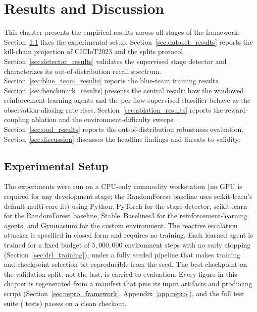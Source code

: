 \clearpage
\chapter{Results and Discussion}\label{cap:results}

This chapter presents the empirical results across all stages of the framework. Section~\ref{sec:exp_setup} fixes the experimental setup. Section~\ref{sec:dataset_results} reports the kill-chain projection of CICIoT2023 and the splits protocol. Section~\ref{sec:detector_results} validates the supervised stage detector and characterizes its out-of-distribution recall spectrum. Section~\ref{sec:blue_team_results} reports the blue-team training results. Section~\ref{sec:benchmark_results} presents the central result: how the windowed reinforcement-learning agents and the per-flow supervised classifier behave as the observation-aliasing rate rises. Section~\ref{sec:ablation_results} reports the reward-coupling ablation and the environment-difficulty sweeps. Section~\ref{sec:ood_results} reports the out-of-distribution robustness evaluation. Section~\ref{sec:discussion} discusses the headline findings and threats to validity.

\section{Experimental Setup}\label{sec:exp_setup}
The experiments were run on a CPU-only commodity workstation (no GPU is required for any development stage; the RandomForest baseline uses scikit-learn's default multi-core fit) using Python, PyTorch for the stage detector, scikit-learn for the RandomForest baseline, Stable~Baselines3 for the reinforcement-learning agents, and Gymnasium for the custom environment. The reactive escalation attacker is specified in closed form and requires no training. Each learned agent is trained for a fixed budget of $5{,}000{,}000$ environment steps with no early stopping (Section~\ref{sec:drl_training}), under a fully seeded pipeline that makes training and checkpoint selection bit-reproducible from the seed. The best checkpoint on the validation split, not the last, is carried to evaluation. Every figure in this chapter is regenerated from a manifest that pins its input artifacts and producing script (Section~\ref{sec:repro_framework}, Appendix~\ref{app:repro}), and the full test suite (\NumTests{} tests) passes on a clean checkout.

